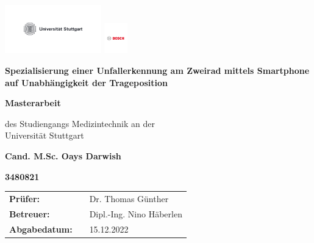 \relax
\begin{center}
	\begin{center}
			\includegraphics[height=2.1cm]{Bilder/Logos/unistuttgart_logo_deutsch.pdf} \hfill \includegraphics[height=1.3cm]{Bilder/Logos/BoschLogotype2.pdf}
	\end{center}
	\vspace*{2.5cm} 
	\begin{center}
		\LARGE\textbf{Spezialisierung einer Unfallerkennung am Zweirad mittels Smartphone auf Unabhängigkeit der Trageposition}
	\end{center}
	\vspace{2.5cm}
	
	\begin{center}
		\textbf{Masterarbeit}
	\end{center}
	\vspace{1cm}
	
	\begin{center}
		des Studiengangs Medizintechnik an der\\
		Universität Stuttgart
	\end{center}
	\vspace{1.8cm}
	\begin{center}
		\textbf{Cand. M.Sc. Oays Darwish} 
	\end{center}	
	
	\begin{center}
		\textbf{3480821}
	\end{center}
	\vspace{2.5cm}
	\begin{center}
		\begin{tabular}{lll}
			\textbf{Prüfer: }&& Dr. Thomas Günther\\
			\textbf{Betreuer:}&& Dipl.-Ing. Nino Häberlen \\
			\textbf{Abgabedatum: }&& 15.12.2022\\
		\end{tabular}
	\end{center}	
	
\end{center}